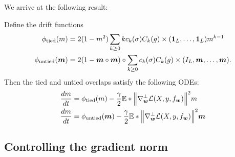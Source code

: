 We arrive at the following result:
\begin{proposition}\label{2506:prop:app:overlap_ode}
    Define the drift functions
    \begin{align*} 
    \phi_{\text{tied}}(m) &= 2(1 - m^2)\sum_{k \geq 0} k c_k(\sigma)C_k(g) \times (\mathbf{1}_L, \dots, \mathbf{1}_L) m^{k-1} \\ 
    \phi_{\text{untied}}({\boldsymbol{m}}) &= 2 (1 - {\boldsymbol{m}} \circ {\boldsymbol{m}}) \circ \sum_{k \geq 0} c_k(\sigma)C_k(g) \times (I_L, {\boldsymbol{m}}, \dots, {\boldsymbol{m}}).
    \end{align*}
    Then the tied and untied overlaps satisfy the following ODEs:
    \begin{align}
        \frac{dm}{dt} &= \phi_{\text{tied}}(m) - \frac{\gamma}{2}  \mathbb{E}*{\left\lVert \nabla_{{\boldsymbol{w}}}^\bot \mathcal{L}(X, y, f_{{\boldsymbol{w}}})\right\rVert^2} m \label{2506:eq:app:tied_dynamics} \\
         \frac{dm}{dt} &= \phi_{\text{untied}}({\boldsymbol{m}}) - \frac{\gamma}{2}  \mathbb{E}*{\left\lVert \nabla_{{\boldsymbol{w}}}^\bot \mathcal{L}(X, y, f_{{\boldsymbol{w}}})\right\rVert^2} {\boldsymbol{m}} \label{2506:eq:app:untied_dynamics}
    \end{align}
\end{proposition}

\subsection{Controlling the gradient norm}

